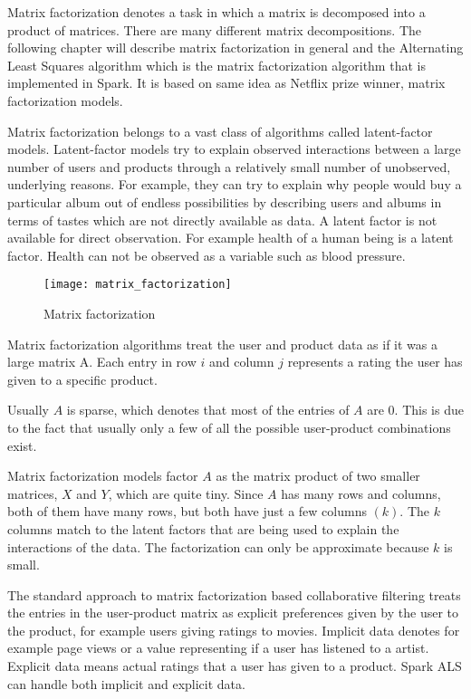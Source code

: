 \documentclass[main.tex]{thesis.tex}
\begin{document}
Matrix factorization denotes a task in which a matrix is decomposed into a product of matrices.
There are many different matrix decompositions.
The following chapter will describe matrix factorization in general and the Alternating Least Squares algorithm which is the matrix factorization algorithm that is implemented in Spark.
It is based on same idea as Netflix prize winner, matrix factorization models.

Matrix factorization belongs to a vast class of algorithms called latent-factor models.
Latent-factor models try to explain observed interactions between a large number of users and products through a relatively small number of unobserved, underlying reasons.
For example, they can try to explain why people would buy a particular album out of endless possibilities by describing users and albums in terms of tastes which are not directly available as data. \cite{ryza15}
A latent factor is not available for direct observation. For example health of a human being is a latent factor.
Health can not be observed as a variable such as blood pressure.

\begin{figure}[h]
	\caption{Matrix factorization \cite{ryza15}}
	\centering
	\texttt{[image: matrix\_factorization]}
\end{figure}

Matrix factorization algorithms treat the user and product data as if it was a large matrix A.
Each entry in row $i$ and column $j$ represents a rating the user has given to a specific product. \cite{ryza15}

Usually $A$ is sparse, which denotes that most of the entries of $A$ are 0.
This is due to the fact that usually only a few of all the possible user-product combinations exist.

Matrix factorization models factor $A$ as the matrix product of two smaller matrices, $X$ and $Y$, which are quite tiny.
Since $A$ has many rows and columns, both of them have many rows, but both have just a few columns $(k)$. The $k$ columns match to the latent factors that are being used to explain the interactions of the data.
The factorization can only be approximate because $k$ is small. \cite{ryza15}

The standard approach to matrix factorization based collaborative filtering treats the entries in the user-product matrix as explicit preferences given by the user to the product, for example users giving ratings to movies.
Implicit data denotes for example page views or a value representing if a user has listened to a artist. Explicit data means actual ratings that a user has given to a product.
Spark ALS can handle both implicit and explicit data. \cite{spark14} \cite{ryza15}
\end{document}
